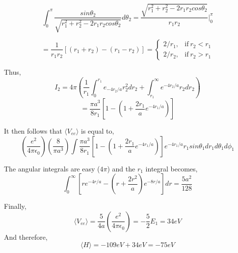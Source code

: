 \begin{equation*}
	\int_{0}^{\pi}\frac{sin\theta_2}{\sqrt{r_1^2+r_2^2-2r_1r_2cos\theta_2}}d\theta_2=\frac{\sqrt{r_1^2+r_2^2-2r_1r_2cos\theta_2}}{r_1r_2}\Big\rvert^\pi_0
\end{equation*}

\begin{equation}
	=\frac{1}{r_1r_2}[(r_1+r_2)-(r_1-r_2)]= 
	\begin{cases}
		2/r_1, & \text{if}\ r_2<r_1 \\
		2/r_2, & \text{if}\ r_2>r_1
	\end{cases}
\end{equation}

Thus,
\begin{equation*}
	I_2=4\pi\left(\frac{1}{r_1}\int_{0}^{r_1}e_{-4r_2/a}r_2^2dr_2+\int_{r_1}^{\infty}e^{-4r_2/a}r_2dr_2\right)
\end{equation*}
\begin{equation}
	=\frac{\pi a^3}{8r_1}\left[1-\left(1+\frac{2r_1}{a}e^{-4r_1/a}\right)\right]
\end{equation}

It then follows that $\langle V_{ee}\rangle$ is equal to,
\begin{equation*}
	\left(\frac{e^2}{4\pi\epsilon_0}\right)\left(\frac{8}{\pi a^3} \right)\int \frac{\pi a^3}{8r_1}\left[1-\left(1+\frac{2r_1}{a}e^{-4r_1/a}\right)\right]e^{-4r_1/a}r_1sin\theta_1 dr_1 d\theta_1 d\phi_1
\end{equation*}

The angular integrals are easy ($4\pi$) and the $r_1$ integral becomes,
\begin{equation*}
	\int_{0}^{\infty}\left[re^{-4r/a}-\left(r+\frac{2r^2}{a}\right)e^{-8r/a}\right]dr=\frac{5a^2}{128}
\end{equation*}

Finally,
\begin{equation}
	\langle V_{ee}\rangle=\frac{5}{4a}\left(\frac{e^2}{4\pi\epsilon_0}\right)=-\frac{5}{2}E_1=34 eV
\end{equation}
And therefore,
\begin{equation}
	\langle H \rangle=-109 eV+34eV=-75eV
\end{equation}

